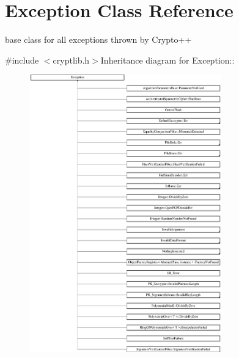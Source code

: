 \hypertarget{class_exception}{
\section{Exception Class Reference}
\label{class_exception}
}


base class for all exceptions thrown by Crypto++  


{\ttfamily \#include $<$cryptlib.h$>$}Inheritance diagram for Exception::\begin{figure}[H]
\begin{center}
\leavevmode
\includegraphics[height=12cm]{class_exception}
\end{center}
\end{figure}
